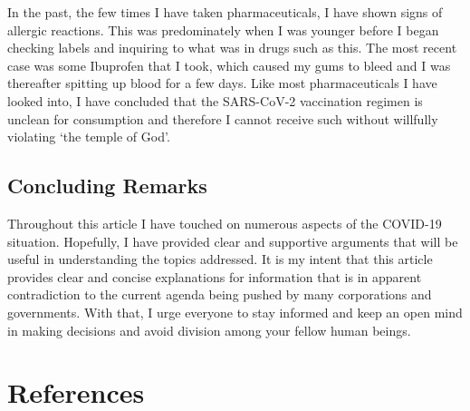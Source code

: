 \documentclass[10pt, a4paper, twocolumn]{book}
\begin{document}
In the past, the few times I have taken pharmaceuticals, I have shown signs of allergic reactions. This was predominately when I was younger before I began checking labels and inquiring to what was in drugs such as this. The most recent case was some Ibuprofen that I took, which caused my gums to bleed and I was thereafter spitting up blood for a few days. Like most pharmaceuticals I have looked into, I have concluded that the SARS-CoV-2 vaccination regimen is unclean for consumption and therefore I cannot receive such without willfully violating `the temple of God'.











\subsection{Concluding Remarks}

Throughout this article I have touched on numerous aspects of the COVID-19 situation. Hopefully, I have provided clear and supportive arguments that will be useful in understanding the topics addressed. It is my intent that this article provides clear and concise explanations for information that is in apparent contradiction to the current agenda being pushed by many corporations and governments. With that, I urge everyone to stay informed and keep an open mind in making decisions and avoid division among your fellow human beings.



\sectionEnd

\section{References}
\begingroup
\let\clearpage\relax
\pagestyle{fancy}
\printbibliography[heading=none]
\endgroup

\end{document}
